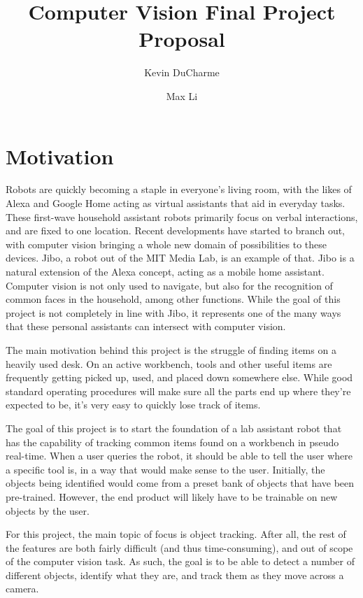 \documentclass[11pt]{article}
\title{Computer Vision Final Project Proposal}
\author{Kevin DuCharme \and Max Li}
\begin{document}
\maketitle
\section{Motivation}
\par Robots are quickly becoming a staple in everyone’s living room, with the likes of Alexa and Google Home acting as virtual assistants that aid in everyday tasks. These first-wave household assistant robots primarily focus on verbal interactions, and are fixed to one location. Recent developments have started to branch out, with computer vision bringing a whole new domain of possibilities to these devices. Jibo, a robot out of the MIT Media Lab, is an example of that. Jibo is a natural extension of the Alexa concept, acting as a mobile home assistant. Computer vision is not only used to navigate, but also for the recognition of common faces in the household, among other functions. While the goal of this project is not completely in line with Jibo, it represents one of the many ways that these personal assistants can intersect with computer vision.

\par The main motivation behind this project is the struggle of finding items on a heavily used desk. On an active workbench, tools and other useful items are frequently getting picked up, used, and placed down somewhere else. While good standard operating procedures will make sure all the parts end up where they're expected to be, it's very easy to quickly lose track of items.
\par The goal of this project is to start the foundation of a lab assistant robot that has the capability of tracking common items found on a workbench in pseudo real-time. When a user queries the robot, it should be able to tell the user where a specific tool is, in a way that would make sense to the user. Initially, the objects being identified would come from a preset bank of objects that have been pre-trained. However, the end product will likely have to be trainable on new objects by the user. 
\par For this project, the main topic of focus is object tracking. After all, the rest of the features are both fairly difficult (and thus time-consuming), and out of scope of the computer vision task. As such, the goal is to be able to detect a number of different objects, identify what they are, and track them as they move across a camera.
\end{document}
